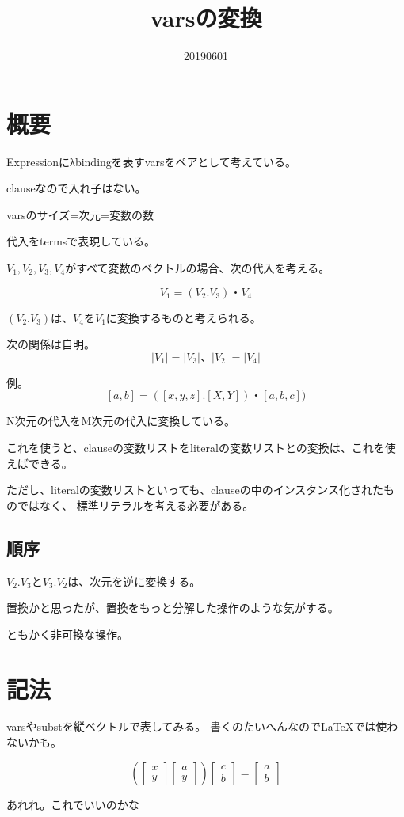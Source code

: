 \documentclass[10pt, onecolumn]{jarticle}   	%
\title{varsの変換}
\author{\myname}
\date{20190601}					%
\begin{document}
\maketitle

\section{概要}
Expressionにλbindingを表すvarsをペアとして考えている。

clauseなので入れ子はない。

varsのサイズ=次元=変数の数

代入をtermsで表現している。


$V_1,V_2,V_3,V_4$がすべて変数のベクトルの場合、次の代入を考える。

$$V_1 = (V_2.V_3)・V_4$$

$(V_2.V_3)$は、$V_4$を$V_1$に変換するものと考えられる。

次の関係は自明。
$$|V_1| = |V_3|、|V_2| = |V_4|$$

例。
$$[a,b] = ([x,y,z].[X,Y])・ [a,b,c])$$

N次元の代入をM次元の代入に変換している。

これを使うと、clauseの変数リストをliteralの変数リストとの変換は、これを使えばできる。


ただし、literalの変数リストといっても、clauseの中のインスタンス化されたものではなく、
標準リテラルを考える必要がある。

\subsection{順序}
$V_2.V_3$と$V_3.V_2$は、次元を逆に変換する。

置換かと思ったが、置換をもっと分解した操作のような気がする。

ともかく非可換な操作。



%

\section{記法}
varsやsubstを縦ベクトルで表してみる。
書くのたいへんなのでLaTeXでは使わないかも。

\[ \left(\left[
\begin{array}{c}
  x \\ y 
\end{array}
  \right]
  \left[
  \begin{array}{c}
  a \\ y
 \end{array}
 \right]
 \right)
   \left[
  \begin{array}{c}
  c \\ b
 \end{array}
 \right]
 =  
  \left[
  \begin{array}{c}
  a \\ b
 \end{array}
 \right]
\]

あれれ。これでいいのかな
\end{document}
